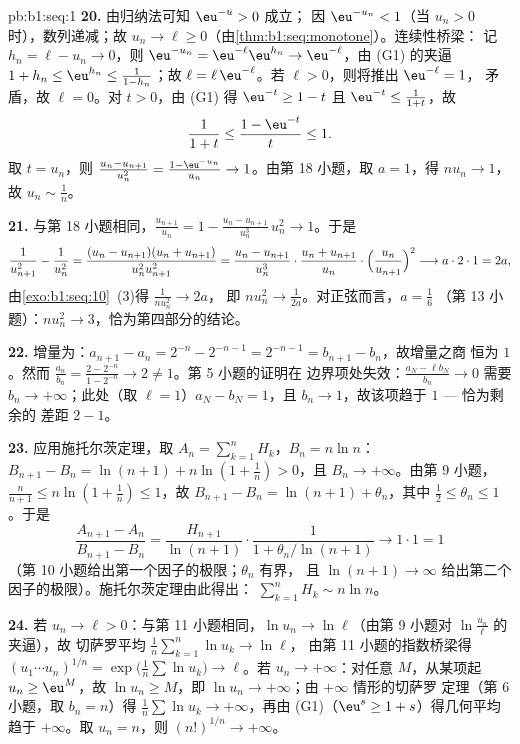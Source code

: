 \begin{solution}{pb:b1:seq:1}
\textbf{20.} 由归纳法可知 $\eu^{-u} > 0$ 成立；
因 $\eu^{-u_n} < 1$（当 $u_n > 0$ 时），数列递减；故 $u_n \to
\ell \geq 0$（由\cref{thm:b1:seq:monotone}）。连续性桥梁：
记 $h_n = \ell - u_n \to 0$，则 $\eu^{-u_n} = \eu^{-\ell}
\eu^{h_n} \to \eu^{-\ell}$，由 (G1) 的夹逼 $1 + h_n \leq
\eu^{h_n} \leq \frac{1}{1 - h_n}$；故 $\ell = \ell\,
\eu^{-\ell}$。若 $\ell > 0$，则将推出 $\eu^{-\ell} = 1$，
矛盾，故 $\ell = 0$。对 $t > 0$，由 (G1) 得 $\eu^{-t} \geq 1 - t$
且 $\eu^{-t} \leq \frac{1}{1 + t}$，故
\[
\frac{1}{1 + t} \leq \frac{1 - \eu^{-t}}{t} \leq 1 .
\]
取 $t = u_n$，则 $\frac{u_n - u_{n+1}}{u_n^2} = \frac{1 -
\eu^{-u_n}}{u_n} \to 1$。由第 18 小题，取 $a = 1$，得 $n u_n \to
1$，故 $u_n \sim \frac1n$。

\textbf{21.} 与第 18 小题相同，$\frac{u_{n+1}}{u_n} = 1 -
\frac{u_n - u_{n+1}}{u_n^3}\,u_n^2 \to 1$。于是
\[
\frac{1}{u_{n+1}^2} - \frac{1}{u_n^2}
= \frac{(u_n - u_{n+1})(u_n + u_{n+1})}{u_n^2 u_{n+1}^2}
= \frac{u_n - u_{n+1}}{u_n^3}\cdot
\frac{u_n + u_{n+1}}{u_n}\cdot
\Bigl(\frac{u_n}{u_{n+1}}\Bigr)^2
\longrightarrow a \cdot 2 \cdot 1 = 2a ,
\]
由\cref{exo:b1:seq:10}~(3)得 $\frac{1}{n u_n^2} \to 2a$，
即 $n u_n^2 \to \frac{1}{2a}$。对正弦而言，$a = \frac16$
（第 13 小题）：$n u_n^2 \to 3$，恰为第四部分的结论。

\textbf{22.} 增量为：$a_{n+1} - a_n = 2^{-n} - 2^{-n-1} =
2^{-n-1} = b_{n+1} - b_n$，故增量之商
恒为 $1$。然而 $\frac{a_n}{b_n} = \frac{2 - 2^{-n}}{1 -
2^{-n}} \to 2 \neq 1$。第 5 小题的证明在
边界项处失效：$\frac{a_N - \ell b_N}{b_n} \to 0$ 需要 $b_n
\to +\infty$；此处（取 $\ell = 1$）$a_N - b_N = 1$，且 $b_n
\to 1$，故该项趋于 $1$ --- 恰为剩余的
差距 $2 - 1$。

\textbf{23.} 应用施托尔茨定理，取 $A_n = \sum_{k=1}^n H_k$，$B_n = n\ln
n$：$B_{n+1} - B_n = \ln(n+1) + n\ln(1 + \frac1n) > 0$，且 $B_n
\to +\infty$。由第 9 小题，$\frac{n}{n+1} \leq n\ln(1 +
\frac1n) \leq 1$，故 $B_{n+1} - B_n = \ln(n+1) + \theta_n$，其中
$\frac12 \leq \theta_n \leq 1$。于是
\[
\frac{A_{n+1} - A_n}{B_{n+1} - B_n}
= \frac{H_{n+1}}{\ln(n+1)}\cdot
\frac{1}{1 + \theta_n/\ln(n+1)} \longrightarrow 1 \cdot 1 = 1
\]
（第 10 小题给出第一个因子的极限；$\theta_n$ 有界，
且 $\ln(n+1) \to \infty$ 给出第二个因子的极限）。施托尔茨定理由此得出：
$\sum_{k=1}^n H_k \sim n\ln n$。

\textbf{24.} 若 $u_n \to \ell > 0$：与第 11 小题相同，$\ln u_n
\to \ln\ell$（由第 9 小题对 $\ln\frac{u_n}{\ell}$ 的夹逼），故
切萨罗平均 $\frac1n\sum_{k=1}^n \ln u_k \to \ln\ell$，
由第 11 小题的指数桥梁得 $(u_1\cdots
u_n)^{1/n} = \exp\bigl(\frac1n\sum\ln u_k\bigr) \to \ell$。若
$u_n \to +\infty$：对任意 $M$，从某项起 $u_n \geq \eu^M$，故
$\ln u_n \geq M$，即 $\ln u_n \to +\infty$；由 $+\infty$ 情形的切萨罗
定理（第 6 小题，取 $b_n = n$）得 $\frac1n\sum \ln u_k \to
+\infty$，再由 (G1)（$\eu^s \geq 1 + s$）得几何平均
趋于 $+\infty$。取 $u_n = n$，则 $(n!)^{1/n} \to +\infty$。


\end{solution}
